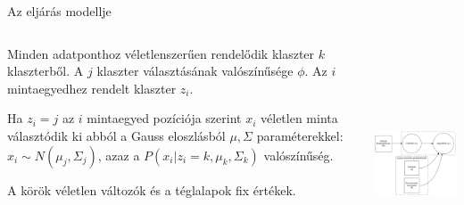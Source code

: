 \documentclass[english, aspectratio=169]{beamer}
\begin{document}
\begin{frame}{Az eljárás modellje}
\begin{columns}
\begin{column}{.5\textwidth}
Minden adatponthoz véletlenszerűen rendelődik klaszter $k$ klaszterből. A $j$ klaszter választásának valószínűsége $\phi$. Az $i$ mintaegyedhez rendelt klaszter $z_i$.\par\medskip
Ha $z_i=j$ az $i$ mintaegyed pozíciója szerint $x_i$ véletlen minta választódik ki abból a Gauss eloszlásból $\mu, \Sigma$ paraméterekkel: $x_i \sim N\left( \mu_j, \Sigma_j \right)$, azaz a $P\left( x_i \vert z_i = k, \mu_k, \Sigma_k \right)$ valószínűség.\par\medskip
A körök véletlen változók és a téglalapok fix értékek. 
\end{column}
\begin{column}{.5\textwidth}
\begin{center}
\includegraphics[width=7cm, height=7cm, keepaspectratio]{graphs/generative_4.png}
\end{center}
\end{column}
\end{columns}
\end{frame}
\end{document}
